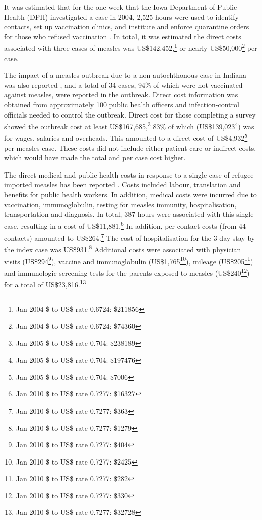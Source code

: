 \documentclass{article}
\begin{document}
It was estimated that for the one week that the Iowa Department of Public Health (DPH) investigated a case in 2004, 2,525 hours were used to identify contacts, set up vaccination clinics, and institute and enforce quarantine orders for those who refused vaccination \citep{dayan5}. In total, it was estimated the direct costs associated with three cases of measles was US\$142,452,\footnote{Jan 2004 \$ to US\$ rate 0.6724: \$211856} or nearly US\$50,000\footnote{Jan 2004 \$ to US\$ rate 0.6724: \$74360} per case.

The impact of a measles outbreak due to a non-autochthonous case in Indiana was also reported \citep{parker6}, and a total of 34 cases, 94\% of which were not vaccinated against measles, were reported in the outbreak. Direct cost information was obtained from approximately 100 public health officers and infection-control officials needed to control the outbreak. Direct cost for those completing a survey showed the outbreak cost at least US\$167,685,\footnote{Jan 2005 \$ to US\$ rate 0.704: \$238189} 83\% of which (US\$139,023\footnote{Jan 2005 \$ to US\$ rate 0.704: \$197476}) was for wages, salaries and overheads. This amounted to a direct cost of US\$4,932\footnote{Jan 2005 \$ to US\$ rate 0.704: \$7006} per measles case. These costs did not include either patient care or indirect costs, which would have made the total and per case cost higher.

The direct medical and public health costs in response to a single case of refugee-imported measles has been reported \citep{coleman12}.  Costs included labour, translation and benefits for public health workers. In addition, medical costs were incurred due to vaccination, immunoglobulin, testing for measles immunity, hospitalisation, transportation and diagnosis. In total, 387 hours were associated with this single case, resulting in a cost of US\$11,881.\footnote{Jan 2010 \$ to US\$ rate 0.7277: \$16327} In addition, per-contact costs (from 44 contacts) amounted to US\$264.\footnote{Jan 2010 \$ to US\$ rate 0.7277: \$363} The cost of hospitalisation for the 3-day stay by the index case was US\$931.\footnote{Jan 2010 \$ to US\$ rate 0.7277: \$1279} Additional costs were associated with physician visits (US\$294\footnote{Jan 2010 \$ to US\$ rate 0.7277: \$404}), vaccine and immunoglobulin (US\$1,765\footnote{Jan 2010 \$ to US\$ rate 0.7277: \$2425}), mileage (US\$205\footnote{Jan 2010 \$ to US\$ rate 0.7277: \$282}) and immunologic screening tests for the parents exposed to measles (US\$240\footnote{Jan 2010 \$ to US\$ rate 0.7277: \$330}) for a total of US\$23,816.\footnote{Jan 2010 \$ to US\$ rate 0.7277: \$32728}
\end{document}
